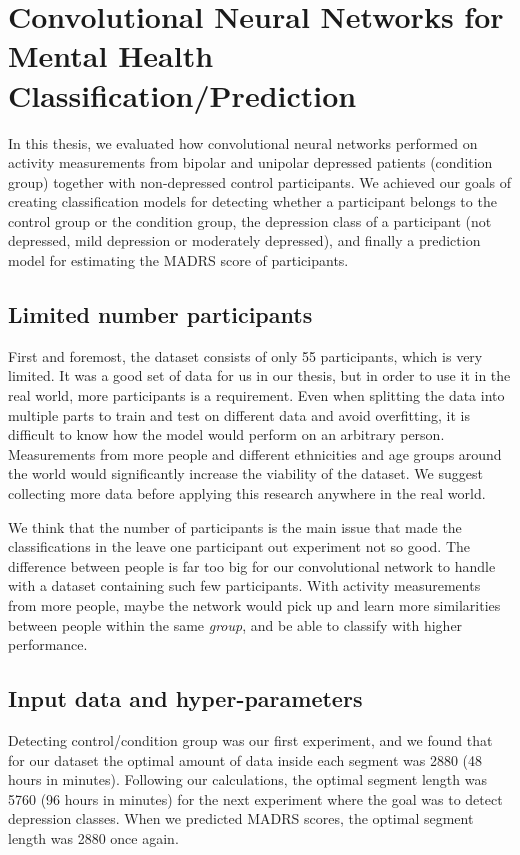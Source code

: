 \section{Convolutional Neural Networks for Mental Health Classification/Prediction}

In this thesis, we evaluated how convolutional neural networks performed on activity measurements from bipolar and unipolar depressed patients (condition group) together with non-depressed control participants. We achieved our goals of creating classification models for detecting whether a participant belongs to the control group or the condition group, the depression class of a participant (not depressed, mild depression or moderately depressed), and finally a prediction model for estimating the MADRS score of participants. 

\subsection{Limited number participants}
First and foremost, the dataset consists of only 55 participants, which is very limited. It was a good set of data for us in our thesis, but in order to use it in the real world, more participants is a requirement. Even when splitting the data into multiple parts to train and test on different data and avoid overfitting, it is difficult to know how the model would perform on an arbitrary person. Measurements from more people and different ethnicities and age groups around the world would significantly increase the viability of the dataset. We suggest collecting more data before applying this research anywhere in the real world.

We think that the number of participants is the main issue that made the classifications in the leave one participant out experiment not so good. The difference between people is far too big for our convolutional network to handle with a dataset containing such few participants. With activity measurements from more people, maybe the network would pick up and learn more similarities between people within the same \textit{group}, and be able to classify with higher performance. 

\subsection{Input data and hyper-parameters}
Detecting control/condition group was our first experiment, and we found that for our dataset the optimal amount of data inside each segment was 2880 (48 hours in minutes). Following our calculations, the optimal segment length was 5760 (96 hours in minutes) for the next experiment where the goal was to detect depression classes. When we predicted MADRS scores, the optimal segment length was 2880 once again. 


